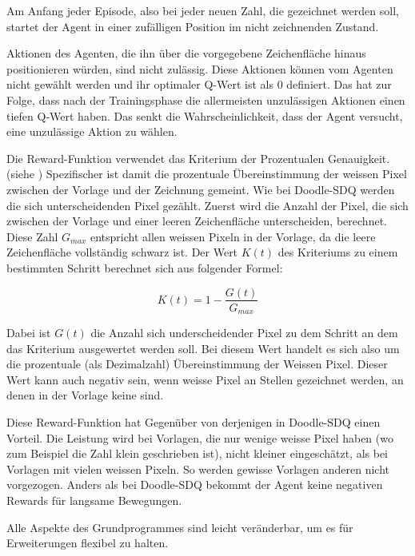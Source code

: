 Am Anfang jeder Episode, also bei jeder neuen Zahl, die gezeichnet werden soll,
startet der Agent in einer zufälligen Position im nicht zeichnenden Zustand.

Aktionen des Agenten, die ihn über die vorgegebene Zeichenfläche hinaus
positionieren würden, sind nicht zulässig. Diese Aktionen können vom Agenten
nicht gewählt werden und ihr optimaler Q-Wert ist als $0$ definiert. Das hat zur
Folge, dass nach der Trainingsphase die allermeisten unzulässigen Aktionen einen
tiefen Q-Wert haben. Das senkt die Wahrscheinlichkeit, dass der Agent versucht,
eine unzulässige Aktion zu wählen.

Die Reward-Funktion verwendet das Kriterium der Prozentualen Genauigkeit. (siehe )
Spezifischer ist damit die prozentuale Übereinstimmung der weissen Pixel
zwischen der Vorlage und der Zeichnung gemeint. Wie bei Doodle-SDQ werden die
sich unterscheidenden Pixel gezählt. Zuerst wird die Anzahl der Pixel, die sich
zwischen der Vorlage und einer leeren Zeichenfläche unterscheiden, berechnet.
Diese Zahl $G_{max}$ entspricht allen weissen Pixeln in der Vorlage, da die
leere Zeichenfläche vollständig schwarz ist. Der Wert $K(t)$ des Kriteriums zu
einem bestimmten Schritt berechnet sich aus folgender Formel:

\begin{equation}
    \label{eq:m_reward}
    K(t) = 1 - \frac{G(t)}{G_{max}}
\end{equation}

Dabei ist $G(t)$ die Anzahl sich underscheidender Pixel zu dem Schritt an dem
das Kriterium ausgewertet werden soll. Bei diesem Wert handelt es sich also um
die prozentuale (als Dezimalzahl) Übereinstimmung der Weissen Pixel. Dieser Wert
kann auch negativ sein, wenn weisse Pixel an Stellen gezeichnet werden, an denen
in der Vorlage keine sind.

Diese Reward-Funktion hat Gegenüber von derjenigen in
Doodle-SDQ einen Vorteil. Die Leistung wird bei Vorlagen, die nur wenige weisse
Pixel haben (wo zum Beispiel die Zahl klein geschrieben ist), nicht kleiner
eingeschätzt, als bei Vorlagen mit vielen weissen Pixeln. So werden gewisse
Vorlagen anderen nicht vorgezogen. Anders als bei Doodle-SDQ bekommt der Agent
keine negativen Rewards für langsame Bewegungen.

Alle Aspekte des Grundprogrammes sind leicht veränderbar, um es für
Erweiterungen flexibel zu halten.


